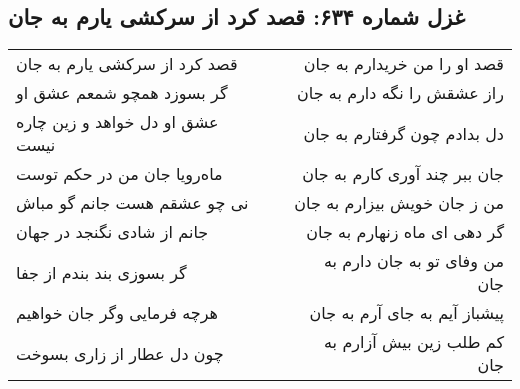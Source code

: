 \begin{center}
\section*{غزل شماره ۶۳۴: قصد کرد از سرکشی یارم به جان}
\label{sec:634}
\begin{longtable}{l p{0.5cm} r}
قصد کرد از سرکشی یارم به جان
&&
قصد او را من خریدارم به جان
\\
گر بسوزد همچو شمعم عشق او
&&
راز عشقش را نگه دارم به جان
\\
عشق او دل خواهد و زین چاره نیست
&&
دل بدادم چون گرفتارم به جان
\\
ماه‌رویا جان من در حکم توست
&&
جان ببر چند آوری کارم به جان
\\
نی چو عشقم هست جانم گو مباش
&&
من ز جان خویش بیزارم به جان
\\
جانم از شادی نگنجد در جهان
&&
گر دهی ای ماه زنهارم به جان
\\
گر بسوزی بند بندم از جفا
&&
من وفای تو به جان دارم به جان
\\
هرچه فرمایی وگر جان خواهیم
&&
پیشباز آیم به جای آرم به جان
\\
چون دل عطار از زاری بسوخت
&&
کم طلب زین بیش آزارم به جان
\\
\end{longtable}
\end{center}
